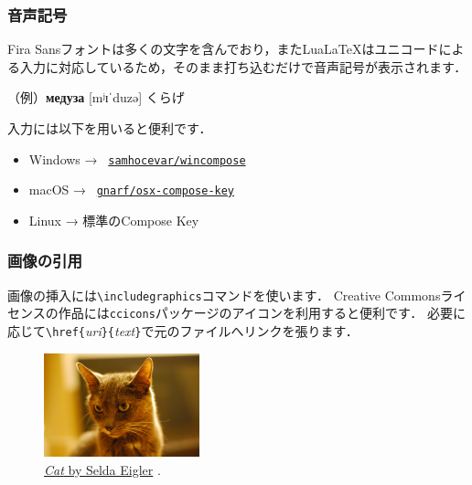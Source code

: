 \documentclass[12pt,unicode]{beamer}
\begin{document}
\begin{frame}
    \frametitle{音声記号}
    Fira Sansフォントは多くの文字を含んでおり，またLua\LaTeX はユニコードによる入力に対応しているため，そのまま打ち込むだけで音声記号が表示されます．

    \smallskip

    （例）\textbf{медуза} [mʲɪˈduzə] くらげ

    \bigskip

    入力には以下を用いると便利です．
    \begin{itemize}
        \item Windows → \faGithub\ \href{https://github.com/samhocevar/wincompose}{\texttt{samhocevar/wincompose}}
        \item macOS → \faGithub\ \href{https://github.com/gnarf/osx-compose-key}{\texttt{gnarf/osx-compose-key}}
        \item Linux → 標準のCompose Key
    \end{itemize}
\end{frame}

\begin{frame}
    \frametitle{画像の引用}
    画像の挿入には\texttt{\textbackslash includegraphics}コマンドを使います．
    Creative Commonsライセンスの作品には\texttt{ccicons}パッケージのアイコンを利用すると便利です．
    必要に応じて\texttt{\textbackslash href\{}\emph{uri}\texttt{\}\{}\emph{text}\texttt{\}}で元のファイルへリンクを張ります．

    \bigskip

    \begin{figure}[b]
        \includegraphics[width=0.4\textwidth]{cat.jpg}
        \caption{\href{https://www.flickr.com/photos/selda_eigler/8687127864/in/photolist-eeDNsC-qWFs4R-7CNDjJ-9c8DxY-eeDNhC-UCZ63T-dJNGUc-e5Nk39-988EVA-kUgwo-owDcVP-jQGjjt-5zkGTy-7WRCUo-b91XbZ-Mj8Ku-5pzwSA-9Bct2H-7CNHMY-7CJJMB-8MyEYn-9x45Mp-7JTq8M-ZrpGJ9-8fRht4-4SxVZT-5pzwjJ-ZsPJjL-aE44GL-dF6uWD-kqbHgM-5F373J-ZsQrVG-qyD7E9-ajyDPL-4WDvTp-KbDSc-5kCxD9-4MdeUo-pgDQcG-pPWrXD-662AFD-oTnC8k-apYceQ-nJSaaY-7CJLZv-7CJJMn-7CNFsU-XNMWkw-ccdtT9}{\emph{Cat} by Selda Eigler} \ccby.}
    \end{figure}

\end{frame}
\end{document}

